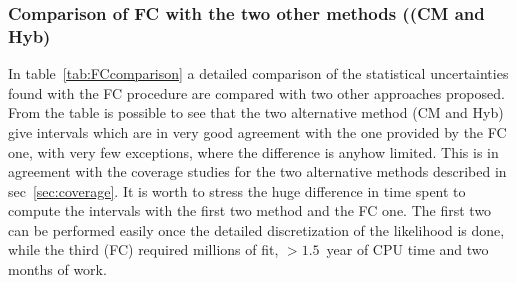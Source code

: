\subsubsection{Comparison of FC with the two other methods ((CM and Hyb)}
In table~\ref{tab:FCcomparison} a detailed comparison of the statistical uncertainties found with the FC procedure are compared with two other approaches proposed.
From the table is possible to see that the two alternative method (CM and Hyb) give intervals which are in very good agreement with the one provided by the FC one, with very few exceptions, where the difference is anyhow limited.
This is in agreement with the coverage studies for the two alternative methods described in sec~\ref{sec:coverage}.
It is worth to stress the huge difference in time spent to compute the intervals with the first two method and the FC one.
The first two can be performed easily once the detailed discretization of the likelihood is done, while the third (FC) required millions of fit, $>1.5$~year of CPU time and two months of work.

